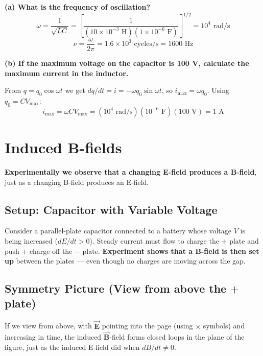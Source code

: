 \documentclass[11pt]{report}
\newcommand{\vbf}[1]{\vec{\mathbf{#1}}}
\begin{document}
\textbf{(a) What is the frequency of oscillation?}
\begin{equation}
\omega = \frac{1}{\sqrt{LC}} = \left[\frac{1}{(10\times 10^{-3}\text{ H})(1\times 10^{-6}\text{ F})}\right]^{1/2} = 10^4\text{ rad/s}
\end{equation}
\begin{equation}
\nu = \frac{\omega}{2\pi} = 1.6\times 10^3\text{ cycles/s} = 1600\text{ Hz}
\end{equation}

\textbf{(b) If the maximum voltage on the capacitor is 100 V, calculate the maximum current in the inductor.}

From $q = q_0\cos\omega t$ we get $dq/dt = i = -\omega q_0\sin\omega t$, so $i_{\max} = \omega q_0$. Using $q_0 = CV_{\max}$:
\begin{equation}
i_{\max} = \omega C V_{\max} = (10^4\text{ rad/s})(10^{-6}\text{ F})(100\text{ V}) = 1\text{ A}
\end{equation}

\section{Induced B-fields}

\textbf{Experimentally we observe that a changing E-field produces a B-field}, just as a changing B-field produces an E-field.

\subsection*{Setup: Capacitor with Variable Voltage}

Consider a parallel-plate capacitor connected to a battery whose voltage $V$ is being increased ($dE/dt > 0$). Steady current must flow to charge the $+$ plate and push $+$ charge off the $-$ plate. \textbf{Experiment shows that a B-field is then set up} between the plates --- even though no charges are moving across the gap.

\subsection*{Symmetry Picture (View from above the $+$ plate)}

If we view from above, with $\vbf{E}$ pointing into the page (using $\times$ symbols) and increasing in time, the induced $\vbf{B}$-field forms closed loops in the plane of the figure, just as the induced E-field did when $dB/dt \neq 0$.
\end{document}
